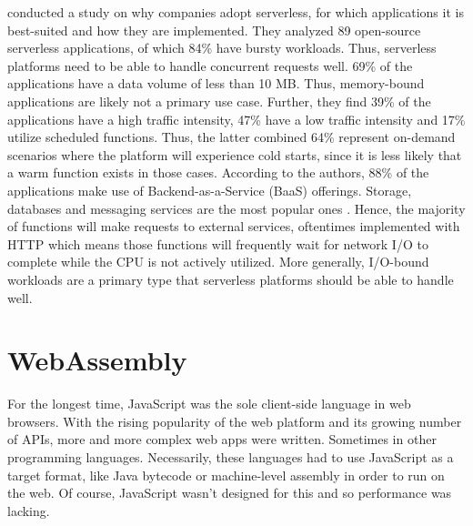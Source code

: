 \citeauthor{Eismann2021} conducted a study on why companies adopt serverless, for which applications it is best-suited and how they are implemented. They analyzed 89 open-source serverless applications, of which 84\% have bursty workloads. Thus, serverless platforms need to be able to handle concurrent requests well. 69\% of the applications have a data volume of less than 10 MB. Thus, memory-bound applications are likely not a primary use case. Further, they find 39\% of the applications have a high traffic intensity, 47\% have a low traffic intensity and 17\% utilize scheduled functions. Thus, the latter combined 64\% represent on-demand scenarios where the platform will experience cold starts, since it is less likely that a warm function exists in those cases. According to the authors, 88\% of the applications make use of Backend-as-a-Service (BaaS) offerings. Storage, databases and messaging services are the most popular ones \cite{Eismann2021}. Hence, the majority of functions will make requests to external services, oftentimes implemented with HTTP which means those functions will frequently wait for network I/O to complete while the CPU is not actively utilized. More generally, I/O-bound workloads are a primary type that serverless platforms should be able to handle well.

\section{WebAssembly}


For the longest time, JavaScript was the sole client-side language in web browsers. With the rising popularity of the web platform and its growing number of APIs, more and more complex web apps were written. Sometimes in other programming languages. Necessarily, these languages had to use JavaScript as a target format, like Java bytecode or machine-level assembly in order to run on the web. Of course, JavaScript wasn't designed for this and so performance was lacking.


